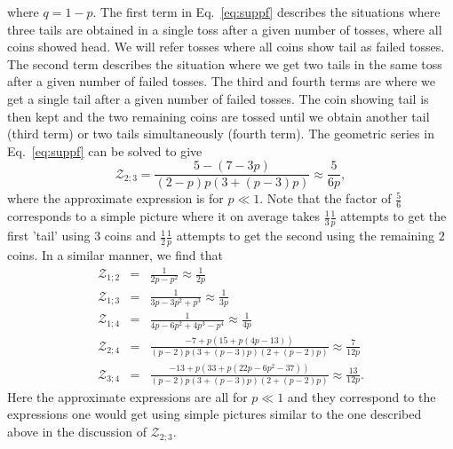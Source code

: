 where $q=1-p$. 
The first term in Eq.~\eqref{eq:suppf} describes the situations where three
tails are obtained in a single toss after a given number of tosses, where all
coins showed head.  We will refer tosses where all coins show tail as failed
tosses. The second term describes the situation where we get two tails in the
same toss after a given number of failed tosses. The third and fourth terms are
where we get a single tail after a given number of failed tosses. The coin
showing tail is then kept and the two remaining coins are tossed until we obtain
another tail (third term) or two tails simultaneously (fourth term). The
geometric series in Eq.~\eqref{eq:suppf} can be solved to give
\begin{equation}
\mathcal{Z}_{2;3}=\frac{5-(7-3p)}{(2-p)p(3+(p-3)p)} \approx\frac{5}{6p},
\end{equation} 
where the approximate expression is for $p\ll1$. Note that the factor of
$\frac{5}{6}$ corresponds to a simple picture where it on average takes
$\frac{1}{3}\frac{1}{p}$ attempts to get the first 'tail' using 3 coins and
$\frac{1}{2}\frac{1}{p}$ attempts to get the second using the remaining $2$
coins. In a similar manner, we find that
\begin{eqnarray}
\mathcal{Z}_{1;2}&=&\frac{1}{2p-p^{2}}\approx\frac{1}{2p} \\
\mathcal{Z}_{1;3}&=&\frac{1}{3p-3p^{2}+p^{3}}\approx\frac{1}{3p} \\
\mathcal{Z}_{1;4}&=&\frac{1}{4p-6p^{2}+4p^{3}-p^{4}}\approx\frac{1}{4p} \\
\mathcal{Z}_{2;4}&=&\frac{-7+p(15+p(4p-13))}{(p-2)p(3+(p-3)p)(2+(p-2)p)}
\approx\frac{7}{12p} \\
\mathcal{Z}_{3;4}&=&\frac{-13+p(33+p(22p-6p^{2}-37))}
{(p-2)p(3+(p-3)p)(2+(p-2)p)}
\approx\frac{13}{12p}. 
\end{eqnarray}
Here the approximate expressions are all for $p\ll1$ and they correspond to the
expressions one would get using simple pictures similar to the one described
above in the discussion of $\mathcal{Z}_{2;3}$.

